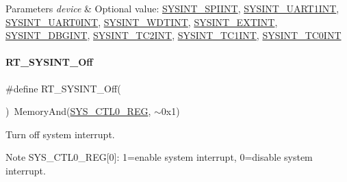 \begin{DoxyParams}{Parameters}
{\em device} & Optional value\+: \mbox{\hyperlink{a00011_a2b01c4fb9d69c049d189fea4336e809c}{S\+Y\+S\+I\+N\+T\+\_\+\+S\+P\+I\+I\+NT}}, \mbox{\hyperlink{a00011_a7fe941b86cf5765bd92b867744aef26c}{S\+Y\+S\+I\+N\+T\+\_\+\+U\+A\+R\+T1\+I\+NT}}, \mbox{\hyperlink{a00011_a5443d7bbceafb7ab2592b01489f23499}{S\+Y\+S\+I\+N\+T\+\_\+\+U\+A\+R\+T0\+I\+NT}}, \mbox{\hyperlink{a00011_af64d968502ca7ba62141dd55f5647730}{S\+Y\+S\+I\+N\+T\+\_\+\+W\+D\+T\+I\+NT}}, \mbox{\hyperlink{a00011_a76cdcef76b44ff2f2125afcf05158f00}{S\+Y\+S\+I\+N\+T\+\_\+\+E\+X\+T\+I\+NT}}, \mbox{\hyperlink{a00011_a9abec7bef84c5bc3310714d05e1138dc}{S\+Y\+S\+I\+N\+T\+\_\+\+D\+B\+G\+I\+NT}}, \mbox{\hyperlink{a00011_a6316f8987b7727eeeeb09e4d5d95db96}{S\+Y\+S\+I\+N\+T\+\_\+\+T\+C2\+I\+NT}}, \mbox{\hyperlink{a00011_aa93c611771ffd54f3f00da8b21ed36f2}{S\+Y\+S\+I\+N\+T\+\_\+\+T\+C1\+I\+NT}}, \mbox{\hyperlink{a00011_afda418bf07550de9ce626627e3cc46d0}{S\+Y\+S\+I\+N\+T\+\_\+\+T\+C0\+I\+NT}} \\
\hline
\end{DoxyParams}
\mbox{\label{a00011_a9c68b82296205323f01358d9a27813a9}} 
\paragraph{\texorpdfstring{R\+T\+\_\+\+S\+Y\+S\+I\+N\+T\+\_\+\+Off}{RT\_SYSINT\_Off}}
{\footnotesize\ttfamily \#define R\+T\+\_\+\+S\+Y\+S\+I\+N\+T\+\_\+\+Off(\begin{DoxyParamCaption}{ }\end{DoxyParamCaption})~Memory\+And(\mbox{\hyperlink{a00020_ab34acec79daf4fcc12a662cde9e75df7}{S\+Y\+S\+\_\+\+C\+T\+L0\+\_\+\+R\+EG}}, $\sim$0x1)}



Turn off system interrupt. 

\begin{DoxyNote}{Note}
S\+Y\+S\+\_\+\+C\+T\+L0\+\_\+\+R\+EG\mbox{[}0\mbox{]}\+: 1=enable system interrupt, 0=disable system interrupt. 
\end{DoxyNote}
\mbox{\label{a00011_a5ddacb2147f802d2af2f507e41043504}} 

